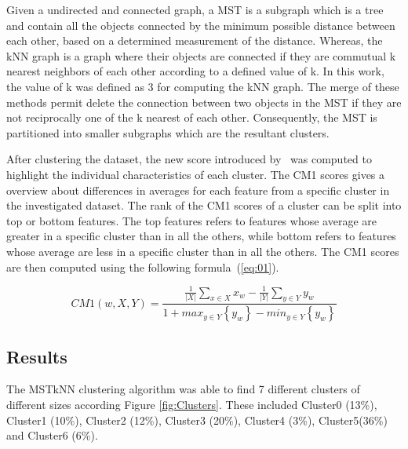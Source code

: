 \documentclass{article}
\begin{document}
Given a undirected and connected graph, a MST is a subgraph which is a tree and
contain all the objects connected by the minimum possible distance between each
other, based on a determined measurement of the distance. Whereas, the kNN graph
is a graph where their objects are connected if they are commutual k nearest
neighbors of each other according to a defined value of k. In this work, the
value of k was defined as 3 for computing the kNN graph. The merge of these
methods permit delete the connection between two objects in the MST if they are
not reciprocally one of the k nearest of each other. Consequently, the MST is
partitioned into smaller subgraphs which are the resultant clusters.


After clustering the dataset, the new score introduced by~\cite{Marsden2013}
was computed to highlight the individual characteristics of each cluster. The
CM1 scores gives a overview about differences in averages for each feature from
a specific cluster in the investigated dataset. The rank of the CM1 scores of a
cluster can be split into top or bottom features. The top features refers to
features whose average are greater in a specific cluster than in all the others,
while bottom refers to features whose average are less in a specific cluster
than in all the others. The CM1 scores are then computed using the following
formula~(\ref{eq:01}).

\begin{equation}
CM1(w,X,Y) = \frac{\frac{1}{\left|X\right|}  \sum_{x \in X} x_{w} - \frac{1}{\left|Y\right|}  \sum_{y \in Y} y_{w}} {1 + max_{y \in Y } \left\{ y_{w} \right\}- min_{y \in Y} \left\{y_{w}\right\} } \label{eq:01}
\end{equation}



\subsection{Results}

The MSTkNN clustering algorithm was able to find 7 different clusters of
different sizes according Figure \ref{fig:Clusters}. These included Cluster0
(13\%), Cluster1 (10\%), Cluster2 (12\%), Cluster3 (20\%), Cluster4 (3\%),
Cluster5(36\%) and Cluster6 (6\%).
\end{document}
